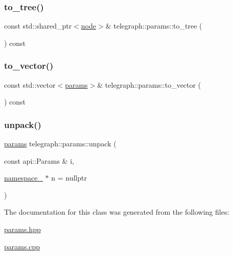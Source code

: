 \mbox{\label{classtelegraph_1_1params_a175321ac3b799e5ea941edcd48fd4b64}} 
\subsubsection{\texorpdfstring{to\+\_\+tree()}{to\_tree()}}
{\footnotesize\ttfamily const std\+::shared\+\_\+ptr$<$\hyperlink{classtelegraph_1_1node}{node}$>$\& telegraph\+::params\+::to\+\_\+tree (\begin{DoxyParamCaption}{ }\end{DoxyParamCaption}) const\hspace{0.3cm}{\ttfamily [inline]}}

\mbox{\label{classtelegraph_1_1params_a7974e92445024059fa346347f479fc9c}} 
\subsubsection{\texorpdfstring{to\+\_\+vector()}{to\_vector()}}
{\footnotesize\ttfamily const std\+::vector$<$\hyperlink{classtelegraph_1_1params}{params}$>$\& telegraph\+::params\+::to\+\_\+vector (\begin{DoxyParamCaption}{ }\end{DoxyParamCaption}) const\hspace{0.3cm}{\ttfamily [inline]}}

\mbox{\label{classtelegraph_1_1params_aef07126189dafa3aafd67fdee35caab8}} 
\subsubsection{\texorpdfstring{unpack()}{unpack()}}
{\footnotesize\ttfamily \hyperlink{classtelegraph_1_1params}{params} telegraph\+::params\+::unpack (\begin{DoxyParamCaption}\item[{const api\+::\+Params \&}]{i,  }\item[{\hyperlink{classtelegraph_1_1namespace__}{namespace\+\_\+} $\ast$}]{n = {\ttfamily nullptr} }\end{DoxyParamCaption})\hspace{0.3cm}{\ttfamily [static]}}



The documentation for this class was generated from the following files\+:\begin{DoxyCompactItemize}
\item 
\hyperlink{params_8hpp}{params.\+hpp}\item 
\hyperlink{params_8cpp}{params.\+cpp}\end{DoxyCompactItemize}
